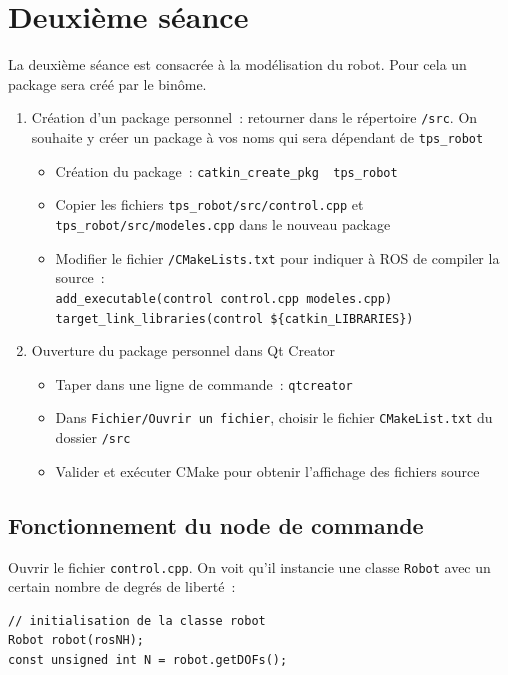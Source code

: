\documentclass[12pt,a4paper]{article}
\begin{document}
\section{Deuxième séance}
La deuxième séance est consacrée à la modélisation du robot.
Pour cela un package sera créé par le binôme. 
\begin{enumerate}
\item  Création d'un package personnel~: retourner dans le répertoire \texttt{\ros/src}. On souhaite y créer un package à vos noms qui sera dépendant de \texttt{tps\_robot}
\begin{itemize}
\item Création du package~: \texttt{catkin\_create\_pkg \bin~tps\_robot}
\item Copier les fichiers \texttt{tps\_robot/src/control.cpp} et \texttt{tps\_robot/src/modeles.cpp} dans le nouveau package
\item Modifier le fichier \texttt{\bin/CMakeLists.txt} pour indiquer à ROS de compiler la source~: \\
\texttt{add\_executable(control control.cpp modeles.cpp) \\ 
target\_link\_libraries(control \$\{catkin\_LIBRARIES\})}
\end{itemize}
\item Ouverture du package personnel dans Qt Creator
\begin{itemize}
\item Taper dans une ligne de commande~: \texttt{qtcreator}
\item Dans \texttt{Fichier/Ouvrir un fichier}, choisir le fichier \texttt{CMakeList.txt} du dossier \linebreak\texttt{\ros/src}
\item Valider et exécuter CMake pour obtenir l'affichage des fichiers source
\end{itemize}
\end{enumerate}

\subsection{Fonctionnement du node de commande}

Ouvrir le fichier \texttt{control.cpp}. On voit qu'il instancie une classe \texttt{Robot} avec un certain nombre de degrés de liberté~:
\begin{verbatim}
// initialisation de la classe robot
Robot robot(rosNH);
const unsigned int N = robot.getDOFs();
\end{verbatim}
\end{document}
